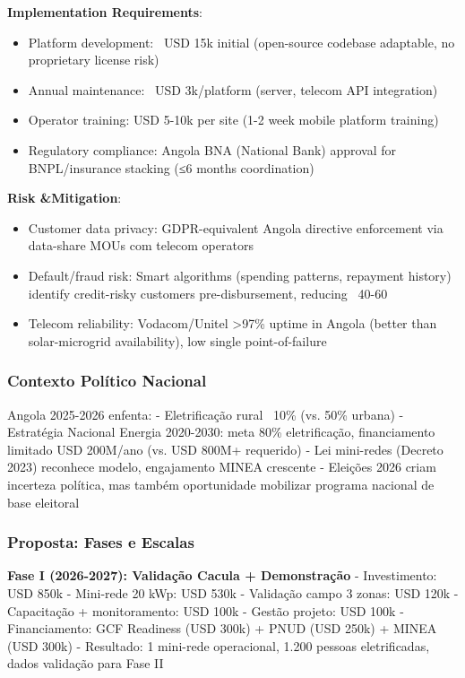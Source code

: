 \documentclass[12pt, a4paper]{article}
\begin{document}
{{{{{{{{{{{{\textbf{Implementation Requirements}:
\begin{itemize}
\item Platform development: ~USD 15k initial (open-source codebase adaptable, no proprietary license risk)
\item Annual maintenance: ~USD 3k/platform (server, telecom API integration)
\item Operator training: USD 5-10k per site (1-2 week mobile platform training)
\item Regulatory compliance: Angola BNA (National Bank) approval for BNPL/insurance stacking (≤6 months coordination)
\end{itemize}

\textbf{Risk &Mitigation}:
\begin{itemize}
\item Customer data privacy: GDPR-equivalent Angola directive enforcement via data-share MOUs com telecom operators
\item Default/fraud risk: Smart algorithms (spending patterns, repayment history) identify credit-risky customers pre-disbursement, reducing ~40-60%
\item Telecom reliability: Vodacom/Unitel >97\% uptime in Angola (better than solar-microgrid availability), low single point-of-failure
\end{itemize}

\subsubsection{Contexto Político Nacional}

Angola 2025-2026 enfenta:
- Eletrificação rural ~10\% (vs. 50\% urbana)
- Estratégia Nacional Energia 2020-2030: meta 80\% eletrificação, financiamento limitado USD 200M/ano (vs. USD 800M+ requerido)
- Lei mini-redes (Decreto 2023) reconhece modelo, engajamento MINEA crescente
- Eleições 2026 criam incerteza política, mas também oportunidade mobilizar programa nacional de base eleitoral

\subsubsection{Proposta: Fases e Escalas}

\textbf{Fase I (2026-2027): Validação Cacula + Demonstração}
- Investimento: USD 850k
  - Mini-rede 20 kWp: USD 530k
  - Validação campo 3 zonas: USD 120k
  - Capacitação + monitoramento: USD 100k
  - Gestão projeto: USD 100k
- Financiamento: GCF Readiness (USD 300k) + PNUD (USD 250k) + MINEA (USD 300k)
- Resultado: 1 mini-rede operacional, 1.200 pessoas eletrificadas, dados validação para Fase II

}}}}}}}}}}}}
\end{document}
